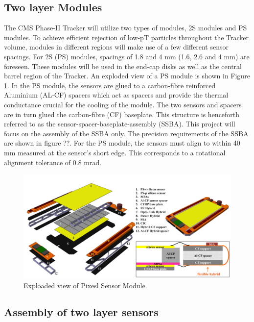 \subsection{Two layer Modules}
The CMS Phase-II Tracker will utilize two types of modules, 2S modules and PS modules. To achieve efficient rejection of low-pT particles throughout the Tracker volume, modules in different regions will make use of a few different sensor spacings. For 2S (PS) modules, spacings of 1.8 and 4 mm (1.6, 2.6 and 4 mm) are foreseen. These modules will be used in the end-cap disks as well as the central barrel region of the Tracker. An exploded view of a PS module is shown in Figure \ref{fig:ps_exploaded}. In the PS module, the sensors are glued to a carbon-fibre reinforced Aluminium (AL-CF) spacers which act as spacers and provide the thermal conductance crucial for the cooling of the module. The two sensors and spacers are in turn glued the carbon-fibre (CF) baseplate. This structure is henceforth referred to as the sensor-spacer-baseplate-assembly (SSBA). This project will focus on the assembly of the SSBA only. The precision requirements of the SSBA are shown in figure ??. For the PS module, the sensors must align to within 40 mm measured at the sensor’s short edge. This corresponds to a rotational alignment tolerance of 0.8 mrad.
\begin{figure}[ht]\centering
\includegraphics[width=0.8\linewidth]{Data/PS_exploaded.png}
\caption{Exploaded view of Pixesl Sensor Module.}
\label{fig:ps_exploaded}
\end{figure}

\subsection{Assembly of two layer sensors}

